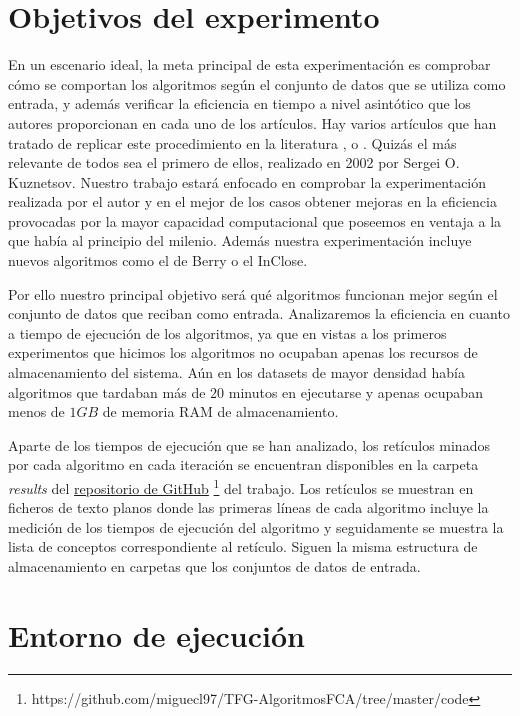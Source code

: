 \documentclass[oneside,openright,titlepage,numbers=noenddot,openany,headinclude,footinclude=true,
cleardoublepage=empty,abstractoff,BCOR=5mm,paper=a4,fontsize=12pt,main=spanish]{scrreprt}
\begin{document}
\section{Objetivos del experimento}

En un escenario ideal, la meta principal de esta experimentación es comprobar cómo se comportan los algoritmos según el conjunto de datos que se utiliza como entrada, y además verificar la eficiencia en tiempo a nivel asintótico que los autores proporcionan en cada uno de los artículos. Hay varios artículos que han tratado de replicar este procedimiento en la literatura \cite{comparingperformance}, \cite{comparingcorta} o \cite{comparing3}. Quizás el más relevante de todos sea el primero de ellos, realizado en 2002 por Sergei O. Kuznetsov. Nuestro trabajo estará enfocado en comprobar la experimentación realizada por el autor y en el mejor de los casos obtener mejoras en la eficiencia provocadas por la mayor capacidad computacional que poseemos en ventaja a la que había al principio del milenio. Además nuestra experimentación incluye nuevos algoritmos como el de Berry o el InClose.

Por ello nuestro principal objetivo será qué algoritmos funcionan mejor según el conjunto de datos que reciban como entrada. Analizaremos la eficiencia en cuanto a tiempo de ejecución de los algoritmos, ya que en vistas a los primeros experimentos que hicimos los algoritmos no ocupaban apenas los recursos de almacenamiento del sistema. Aún en los datasets de mayor densidad había algoritmos que tardaban más de $20$ minutos en ejecutarse y apenas ocupaban menos de $1GB$ de memoria RAM de almacenamiento.

Aparte de los tiempos de ejecución que se han analizado, los retículos minados por cada algoritmo en cada iteración se encuentran disponibles en la carpeta \textit{results} del \href{https://github.com/miguecl97/TFG-AlgoritmosFCA/tree/master/code}{repositorio de GitHub} \footnote{https://github.com/miguecl97/TFG-AlgoritmosFCA/tree/master/code} del trabajo. Los retículos se muestran en ficheros de texto planos donde las primeras líneas de cada algoritmo incluye la medición de los tiempos de ejecución del algoritmo y seguidamente se muestra la lista de conceptos correspondiente al retículo. Siguen la misma estructura de almacenamiento en carpetas que los conjuntos de datos de entrada.


\section{Entorno de ejecución}
\end{document}
